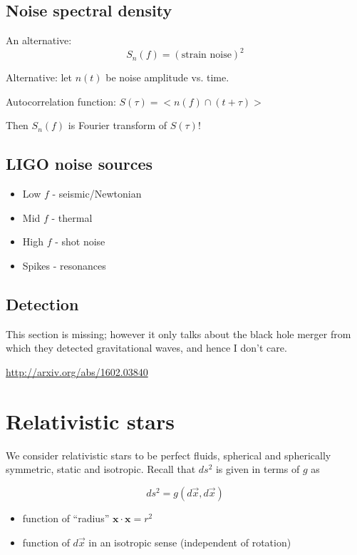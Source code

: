 \documentclass[a4paper]{article} %
\newcommand{\vect}[1]{\mathbf{#1}} %
\begin{document}
\subsection{Noise spectral density}
An alternative:
\begin{equation}
S_n(f)=(\text{strain noise})^2
\end{equation}

Alternative: let $n(t)$ be noise amplitude vs. time.

Autocorrelation function: $S(\tau)=<n(f)\cap (t+\tau)>$

Then $S_n(f)$ is Fourier transform of $S(\tau)$!

\subsection{LIGO noise sources}
\begin{itemize}
\item Low $f$ - seismic/Newtonian
\item Mid $f$ - thermal
\item High $f$ - shot noise
\item Spikes - resonances
\end{itemize}



\subsection{Detection}

This section is missing; however it only talks about the black hole merger from which they detected gravitational waves, and hence I don't care.

\url{http://arxiv.org/abs/1602.03840}





\section{Relativistic stars}

We consider relativistic stars to be perfect fluids, spherical and spherically symmetric, static and isotropic. Recall that $ds^2$ is given in terms of $g$ as

\begin{equation}
ds^2=g(d\vec{x},d\vec{x})
\end{equation}
\begin{itemize}
\item function of ``radius'' $\vect{x}\cdot \vect{x}=r^2$
\item function of $d\vec{x}$ in an isotropic sense (independent of rotation)
\end{itemize}
\end{document}
